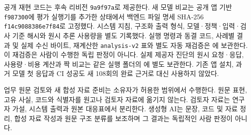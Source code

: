 \documentclass[10pt,letterpaper,twocolumn]{article}
\begin{document}
공개 재현 코드는 후속 리비전 \texttt{9a9f97a}로 제공한다. 새 모델 비교는 공개 앱 기반 \texttt{f987300}에 평가 실행기를 추가한 상태에서 백엔드 파일 명세 SHA-256 \texttt{f14c9088386e7f84}로 고정했다. 시스템 지침, 구조화 출력 형식, 모델·정책·입력·검사 기준 해시와 원시 추론 사용량을 별도 기록했다. 실행 명령과 동결 코드, 사례별 결과 및 실제 수신 바이트, 재계산한 \texttt{analysis-v2} 표와 별도 자동 재검증은 에 보관한다. 이 재검증은 사람이 수행한 독립 판정이 아니다. 실제 제공자 진단의 원시 요청·응답, 사용량·비용 계산과 짝 비교는 같은 실행 폴더의 에 별도 보관한다. 기존 앱 설치, 과거 모델 첫 응답과 CI 성공도 새 108회의 완료 근거로 대신 사용하지 않았다.

업무 원문 검토와 새 합성 자료 준비는 소유자가 허용한 범위에서 수행한다. 원문 표현, 고유 사실, 코드와 식별자를 원고나 검토자 자료에 옮기지 않는다. 검토자 자료는 연구자 가설, 시스템 출력과 원본 대응표에서 분리한다. 생성형 AI는 문장, 코드 및 자료 정리, 합성 자료 작성과 원문 구조 분류를 보조하며 그 결과는 독립적인 사람 판정이 아니다.
\end{document}
